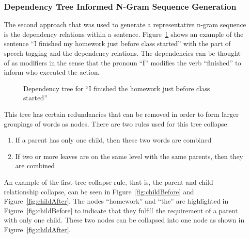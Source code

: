\documentclass{article}[10]
\begin{document}
\subsubsection{Dependency Tree Informed N-Gram Sequence Generation\label{sec:dependency}}

The second approach that was used to generate a representative n-gram
sequence is the dependency relations within a sentence.
Figure~\ref{fig:dep} shows an example of the sentence
``I finished my homework just before class started'' with the part of
speech tagging and the dependency relations. The dependencies can be
thought of as modifiers in the sense that the pronoun ``I'' modifies the
verb ``finished'' to inform who executed the action.

\begin{figure}[H]
  \begin{center}
    \caption{Dependency tree for ``I finished the homework just before class
      started''\label{fig:dep}}
  \end{center}
\end{figure}

This tree has certain redundancies that can be removed in order to form
larger groupings of words as nodes. There are two rules used for this
tree collapse:

\begin{enumerate}
    \item{If a parent has only one child, then these two words are combined}
    \item{If two or more leaves are on the same level with the same parents, then they are combined}
\end{enumerate}

An example of the first tree collapse rule, that is, the parent and
child relationship collapse, can be seen in
Figure~\ref{fig:childBefore} and Figure~\ref{fig:childAfter}. The nodes ``homework'' and
``the'' are highlighted in Figure~\ref{fig:childBefore} to
indicate that they fulfill the requirement of a parent with only one
child. These two nodes can be collapsed into one node as shown in
Figure~\ref{fig:childAfter}.
\end{document}
